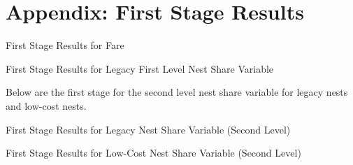 \documentclass{article}
\begin{document}
\section{Appendix: First Stage Results}
\begin{table}[htbp]
    \caption{First Stage Results for Fare}
    \centering

\end{table}

\begin{table}[htbp]
    \caption{First Stage Results for Legacy First Level Nest Share Variable}
    \centering
    
\end{table}

\pagebreak
Below are the first stage for the second level nest share variable for legacy nests and low-cost nests.
\begin{table}[htbp]
    \caption{First Stage Results for Legacy Nest Share Variable (Second Level)}
    \centering
    
\end{table}

\begin{table}[htbp]
    \caption{First Stage Results for Low-Cost Nest Share Variable (Second Level)}
    \centering
    
\end{table}
\end{document}
